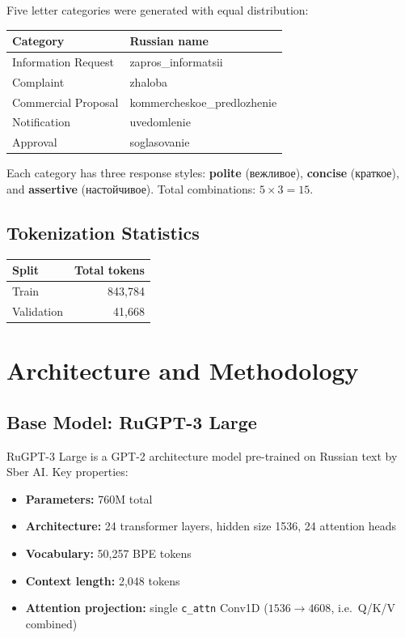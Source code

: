 \documentclass[12pt,a4paper]{article}
\begin{document}
Five letter categories were generated with equal distribution:

\begin{center}
\begin{tabular}{ll}
\toprule
Category & Russian name \\
\midrule
Information Request & zapros\_informatsii \\
Complaint & zhaloba \\
Commercial Proposal & kommercheskoe\_predlozhenie \\
Notification & uvedomlenie \\
Approval & soglasovanie \\
\bottomrule
\end{tabular}
\end{center}

Each category has three response styles: \textbf{polite} (вежливое), \textbf{concise} (краткое), and \textbf{assertive} (настойчивое). Total combinations: $5 \times 3 = 15$.

\subsection{Tokenization Statistics}

\begin{center}
\begin{tabular}{lr}
\toprule
Split & Total tokens \\
\midrule
Train & 843,784 \\
Validation & 41,668 \\
\bottomrule
\end{tabular}
\end{center}

\section{Architecture and Methodology}

\subsection{Base Model: RuGPT-3 Large}

RuGPT-3 Large is a GPT-2 architecture model pre-trained on Russian text by Sber AI. Key properties:

\begin{itemize}
  \item \textbf{Parameters:} 760M total
  \item \textbf{Architecture:} 24 transformer layers, hidden size 1536, 24 attention heads
  \item \textbf{Vocabulary:} 50,257 BPE tokens
  \item \textbf{Context length:} 2,048 tokens
  \item \textbf{Attention projection:} single \texttt{c\_attn} Conv1D ($1536 \to 4608$, i.e.\ Q/K/V combined)
\end{itemize}
\end{document}
